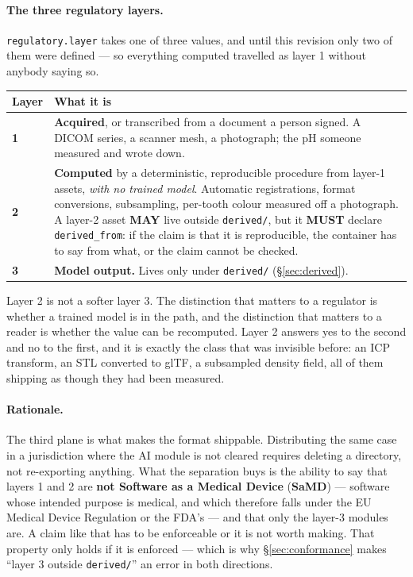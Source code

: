 \documentclass[11pt,a4paper]{article}
\newcommand{\MUST}{\textcolor{uosred}{\textbf{MUST}}}
\newcommand{\MAY}{\textcolor{uosgreen}{\textbf{MAY}}}
\newcommand{\code}[1]{\texttt{\small #1}}
\begin{document}
\paragraph{The three regulatory layers.}
\code{regulatory.layer} takes one of three values, and until this revision only two of
them were defined --- so everything computed travelled as layer 1 without anybody saying
so.

\begin{longtable}{L{1.4cm} L{13.9cm}}
\toprule
\textbf{Layer} & \textbf{What it is}\\
\midrule
\endhead
\textbf{1} & \textbf{Acquired}, or transcribed from a document a person signed. A DICOM
series, a scanner mesh, a photograph; the pH someone measured and wrote down.\\
\textbf{2} & \textbf{Computed} by a deterministic, reproducible procedure from layer-1
assets, \emph{with no trained model}. Automatic registrations, format conversions,
subsampling, per-tooth colour measured off a photograph. A layer-2 asset \MAY{} live
outside \code{derived/}, but it \MUST{} declare \code{derived\_from}: if the claim is that
it is reproducible, the container has to say from what, or the claim cannot be checked.\\
\textbf{3} & \textbf{Model output.} Lives only under \code{derived/}
(\S\ref{sec:derived}).\\
\bottomrule
\end{longtable}

Layer 2 is not a softer layer 3. The distinction that matters to a regulator is whether a
trained model is in the path, and the distinction that matters to a reader is whether the
value can be recomputed. Layer 2 answers yes to the second and no to the first, and it is
exactly the class that was invisible before: an ICP transform, an STL converted to glTF, a
subsampled density field, all of them shipping as though they had been measured.

\paragraph{Rationale.} The third plane is what makes the format shippable. Distributing
the same case in a jurisdiction where the AI module is not cleared requires deleting a
directory, not re-exporting anything. What the separation buys is the ability to say that
layers 1 and 2 are \textbf{not Software as a Medical Device} (\textbf{SaMD}) --- software
whose intended purpose is medical, and which therefore falls under the EU Medical Device
Regulation or the FDA's --- and that only the layer-3 modules are. A claim like that has to
be enforceable or it is not worth making. That property only holds if it is enforced --- which
is why \S\ref{sec:conformance} makes ``layer 3 outside \code{derived/}'' an error in both
directions.
\end{document}
